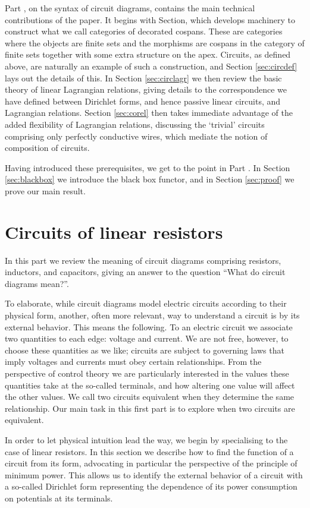 Part , on the syntax of circuit diagrams, contains the main
technical contributions of the paper. It begins with Section,
which develops machinery to construct what we call categories of decorated
cospans. These are categories where the objects are finite sets and the morphisms
are cospans in the category of finite sets together with some extra structure on
the apex. Circuits, as defined above, are naturally an example of such a
construction, and Section \ref{sec:circdef} lays out the details of this.
In Section \ref{sec:circlagr} we then review the basic theory of linear
Lagrangian relations, giving details to the correspondence we have defined
between Dirichlet forms, and hence passive linear circuits, and Lagrangian
relations. Section \ref{sec:corel} then takes immediate advantage of the added
flexibility of Lagrangian relations, discussing the `trivial' circuits
comprising only perfectly conductive wires, which mediate the notion of composition
of circuits.

Having introduced these prerequisites, we get to the point in Part .
In Section \ref{sec:blackbox} we introduce the black box functor,  and  in Section \ref{sec:proof} we prove our main result.

\section{Circuits of linear resistors} \label{sec:resistors}
In this part we review the meaning of circuit diagrams comprising resistors,
inductors, and capacitors, giving an answer to the question ``What do circuit
diagrams mean?''. 

To elaborate, while circuit diagrams model electric circuits according to their
physical form, another, often more relevant, way to understand a circuit is by
its external behavior. This means the following. To an electric circuit we
associate two quantities to each edge: voltage and current. We are not free,
however, to choose these quantities as we like; circuits are subject to
governing laws that imply voltages and currents must obey certain relationships.
From the perspective of control theory we are particularly interested in the
values these quantities take at the so-called terminals, and how altering one
value will affect the other values. We call two circuits equivalent when they
determine the same relationship. Our main task in this first part is to explore
when two circuits are equivalent.

In order to let physical intuition lead the way, we begin by specialising to the
case of linear resistors. In this section we describe how to find the function
of a circuit from its form, advocating in particular the perspective of the
principle of minimum power. This allows us to identify the external behavior of a
circuit with a so-called Dirichlet form representing the dependence of its power
consumption on potentials at its terminals.

